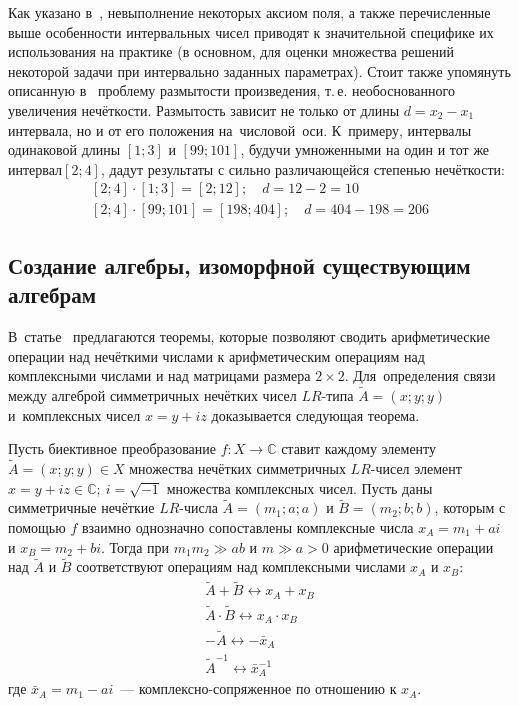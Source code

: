 Как указано в~\cite{Levin}, невыполнение некоторых аксиом поля, а также перечисленные выше особенности интервальных чисел приводят к значительной специфике их использования на практике (в основном, для оценки множества решений некоторой задачи при интервально заданных параметрах). Стоит также упомянуть описанную в~\cite{Spesivtsev, Yakhyaeva} проблему размытости произведения, т.\,е. необоснованного увеличения нечёткости. Размытость зависит не только от длины $d={{x}_{2}}-{{x}_{1}}$ интервала, но и от его положения на~числовой~оси. К~примеру, интервалы одинаковой длины $\left[ 1;3 \right]$ и $\left[ 99;101 \right]$, будучи умноженными на один и тот же интервал$\left[ 2;4 \right]$, дадут результаты с сильно различающейся степенью нечёткости:
\begin{equation*}
	\begin{matrix}
		\left[ 2;4 \right]\cdot \left[ 1;3 \right]=\left[ 2;12 \right];\quad d=12-2=10 \\ 
		\left[ 2;4 \right]\cdot \left[ 99;101 \right]=\left[ 198;404 \right];\quad d=404-198=206 
	\end{matrix}
\end{equation*}

\subsection{Создание алгебры, изоморфной существующим алгебрам}
В~статье~\cite{Uskov_Complex} предлагаются теоремы, которые позволяют сводить арифметические операции над нечёткими числами к арифметическим операциям над комплексными числами и над матрицами размера $2\times 2$. Для~определения связи между алгеброй симметричных нечётких чисел $LR$-типа $\tilde{A}=\left( x;y;y \right)$ и~комплексных чисел $x=y+iz$ доказывается следующая теорема.

\begin{theorem}
Пусть биективное преобразование $f:X\to \mathbb{C}$ ставит каждому элементу $\tilde{A}=\left( x;y;y \right)\in X$ множества нечётких симметричных $LR$-чисел элемент $x=y+iz\in \mathbb{C};\ i=\sqrt{-1}$ множества комплексных чисел. Пусть даны симметричные нечёткие $LR$-числа $\tilde{A}=\left( {{m}_{1}};a;a \right)$ и $\tilde{B}=\left( {{m}_{2}};b;b \right)$, которым с помощью $f$ взаимно однозначно сопоставлены комплексные числа $x_A=m_1+ai$ и $x_B=m_2+bi$. Тогда при ${{m}_{1}}{{m}_{2}}\gg ab$ и $m\gg a>0$ арифметические операции над $\tilde A$ и $\tilde B$ соответствуют операциям над комплексными числами ${{x}_{A}}$ и ${{x}_{B}}$:
\begin{gather*}
	\tilde{A}+\tilde{B}\leftrightarrow {{x}_{A}}+{{x}_{B}} \\ 
	\tilde{A}\cdot \tilde{B}\leftrightarrow {{x}_{A}}\cdot {{x}_{B}} \\ 
	-\tilde{A}\leftrightarrow -{{{\bar{x}}}_{A}} \\ 
  	{{{\tilde{A}}}^{-1}}\leftrightarrow \bar{x}_{A}^{-1} 
\end{gather*}
где ${{\bar{x}}_{A}}={{m}_{1}}-ai$~--- комплексно-сопряженное по отношению к $x_A$.
\end{theorem}

